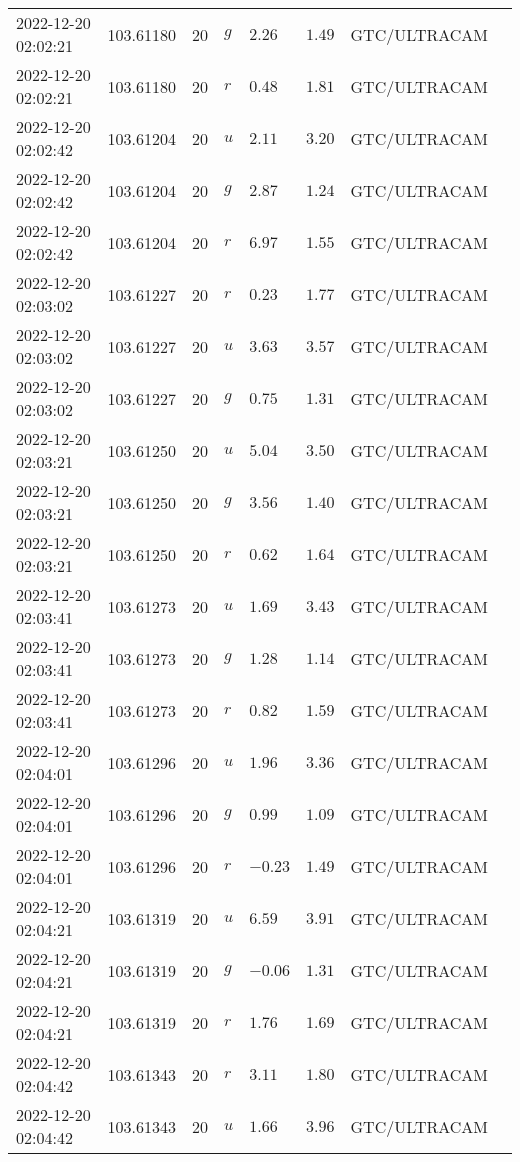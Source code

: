 \documentclass{nature_plusfigure}
\begin{document}
\begin{supplement}
\begin{center}
\begin{longtable}{llllllll}
2022-12-20 02:02:21 & 103.61180 & 20 & $g$ & $2.26$ & $1.49$ & GTC/ULTRACAM &  \\ 
2022-12-20 02:02:21 & 103.61180 & 20 & $r$ & $0.48$ & $1.81$ & GTC/ULTRACAM &  \\ 
2022-12-20 02:02:42 & 103.61204 & 20 & $u$ & $2.11$ & $3.20$ & GTC/ULTRACAM &  \\ 
2022-12-20 02:02:42 & 103.61204 & 20 & $g$ & $2.87$ & $1.24$ & GTC/ULTRACAM &  \\ 
2022-12-20 02:02:42 & 103.61204 & 20 & $r$ & $6.97$ & $1.55$ & GTC/ULTRACAM &  \\ 
2022-12-20 02:03:02 & 103.61227 & 20 & $r$ & $0.23$ & $1.77$ & GTC/ULTRACAM &  \\ 
2022-12-20 02:03:02 & 103.61227 & 20 & $u$ & $3.63$ & $3.57$ & GTC/ULTRACAM &  \\ 
2022-12-20 02:03:02 & 103.61227 & 20 & $g$ & $0.75$ & $1.31$ & GTC/ULTRACAM &  \\ 
2022-12-20 02:03:21 & 103.61250 & 20 & $u$ & $5.04$ & $3.50$ & GTC/ULTRACAM &  \\ 
2022-12-20 02:03:21 & 103.61250 & 20 & $g$ & $3.56$ & $1.40$ & GTC/ULTRACAM &  \\ 
2022-12-20 02:03:21 & 103.61250 & 20 & $r$ & $0.62$ & $1.64$ & GTC/ULTRACAM &  \\ 
2022-12-20 02:03:41 & 103.61273 & 20 & $u$ & $1.69$ & $3.43$ & GTC/ULTRACAM &  \\ 
2022-12-20 02:03:41 & 103.61273 & 20 & $g$ & $1.28$ & $1.14$ & GTC/ULTRACAM &  \\ 
2022-12-20 02:03:41 & 103.61273 & 20 & $r$ & $0.82$ & $1.59$ & GTC/ULTRACAM &  \\ 
2022-12-20 02:04:01 & 103.61296 & 20 & $u$ & $1.96$ & $3.36$ & GTC/ULTRACAM &  \\ 
2022-12-20 02:04:01 & 103.61296 & 20 & $g$ & $0.99$ & $1.09$ & GTC/ULTRACAM &  \\ 
2022-12-20 02:04:01 & 103.61296 & 20 & $r$ & $-0.23$ & $1.49$ & GTC/ULTRACAM &  \\ 
2022-12-20 02:04:21 & 103.61319 & 20 & $u$ & $6.59$ & $3.91$ & GTC/ULTRACAM &  \\ 
2022-12-20 02:04:21 & 103.61319 & 20 & $g$ & $-0.06$ & $1.31$ & GTC/ULTRACAM &  \\ 
2022-12-20 02:04:21 & 103.61319 & 20 & $r$ & $1.76$ & $1.69$ & GTC/ULTRACAM &  \\ 
2022-12-20 02:04:42 & 103.61343 & 20 & $r$ & $3.11$ & $1.80$ & GTC/ULTRACAM &  \\ 
2022-12-20 02:04:42 & 103.61343 & 20 & $u$ & $1.66$ & $3.96$ & GTC/ULTRACAM &  \\ 

\end{longtable}
\end{center}
\end{supplement}
\end{document}
